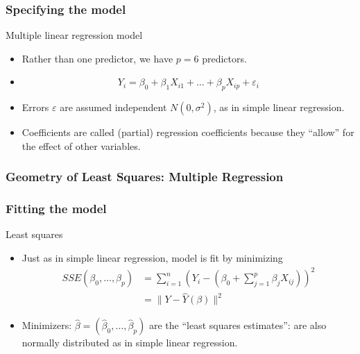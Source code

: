 \documentclass[handout]{beamer}
\begin{document}
   \begin{frame} \frametitle{Specifying the model}

   \begin{block}
   {Multiple linear regression      model}

   \begin{itemize}

   \item Rather than one predictor, we have $p=6$ predictors.

   \item $$
   Y_i = \beta_0 + \beta_1 X_{i1} + \dots + \beta_p X_{ip} + \varepsilon_i
   $$

   \item Errors $\varepsilon$ are assumed independent $N(0,\sigma^2)$, as in simple linear regression.

   \item Coefficients are called (partial) regression coefficients because they ``allow'' for the effect of other variables.

   \end{itemize}
   \end{block}
   \end{frame}


   \begin{frame} \frametitle{Geometry of Least Squares: Multiple Regression}

   \end{frame}


   \begin{frame} \frametitle{Fitting the model}

   \begin{block}
   {Least squares}
   \begin{itemize}

   \item Just as in simple linear regression, model is fit by minimizing
   $$
   \begin{aligned}
   SSE(\beta_0, \dots, \beta_p) &= \sum_{i=1}^n(Y_i - (\beta_0 + \sum_{j=1}^p \beta_j X_{ij}))^2 \\
   &= \|Y - \widehat{Y}(\beta)\|^2
   \end{aligned}
   $$

   \item Minimizers: $\widehat{\beta} = (\widehat{\beta}_0, \dots, \widehat{\beta}_p)$ are
   the ``least squares estimates'': are also normally distributed as in simple linear regression.


   \end{itemize}
   \end{block}
   \end{frame}
\end{document}
